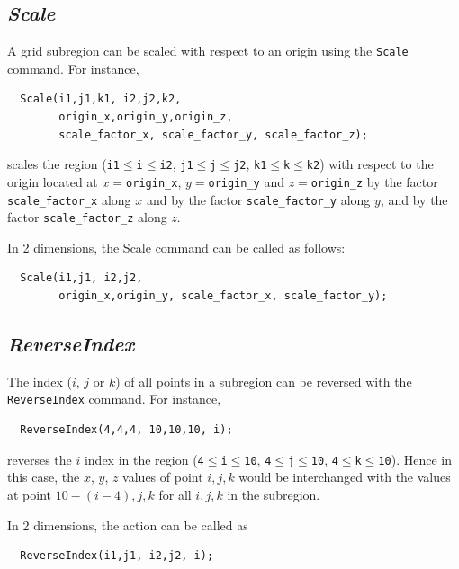 \documentclass{warpdoc}
\begin{document}
\subsection{\emph{Scale}}

A grid subregion can be scaled with respect to
an origin using the \verb|Scale| command. For instance,
%
\begin{verbatim}
  Scale(i1,j1,k1, i2,j2,k2,
        origin_x,origin_y,origin_z,
        scale_factor_x, scale_factor_y, scale_factor_z);
\end{verbatim}
%
 scales the region
(\verb|i1|$\leq$\verb|i|$\leq$\verb|i2|,
  \verb|j1|$\leq$\verb|j|$\leq$\verb|j2|,
  \verb|k1|$\leq$\verb|k|$\leq$\verb|k2|)
with respect to the origin located at $x=$\verb|origin_x|,
$y=$\verb|origin_y| and $z=$\verb|origin_z| by the factor
\verb|scale_factor_x| along $x$ and by the factor
\verb|scale_factor_y| along $y$, and by the factor
\verb|scale_factor_z| along $z$.

In 2 dimensions, the Scale command can be called as follows:
%
\begin{verbatim}
  Scale(i1,j1, i2,j2,
        origin_x,origin_y, scale_factor_x, scale_factor_y);
\end{verbatim}
%



\subsection{\emph{ReverseIndex}}

The index ($i$, $j$ or $k$) of all points in a subregion
can be reversed with the
\verb|ReverseIndex| command. For instance,
%
\begin{verbatim}
  ReverseIndex(4,4,4, 10,10,10, i);
\end{verbatim}
%
 reverses the $i$ index in the region
(\verb|4|$\leq$\verb|i|$\leq$\verb|10|,
  \verb|4|$\leq$\verb|j|$\leq$\verb|10|,
  \verb|4|$\leq$\verb|k|$\leq$\verb|10|).
Hence in this case, the $x$, $y$, $z$ values of
point $i,j,k$ would be interchanged with the values
at point $10-(i-4),j,k$ for all $i,j,k$ in the subregion.

In 2 dimensions, the action can be called as
%
\begin{verbatim}
  ReverseIndex(i1,j1, i2,j2, i);
\end{verbatim}
%
\end{document}
